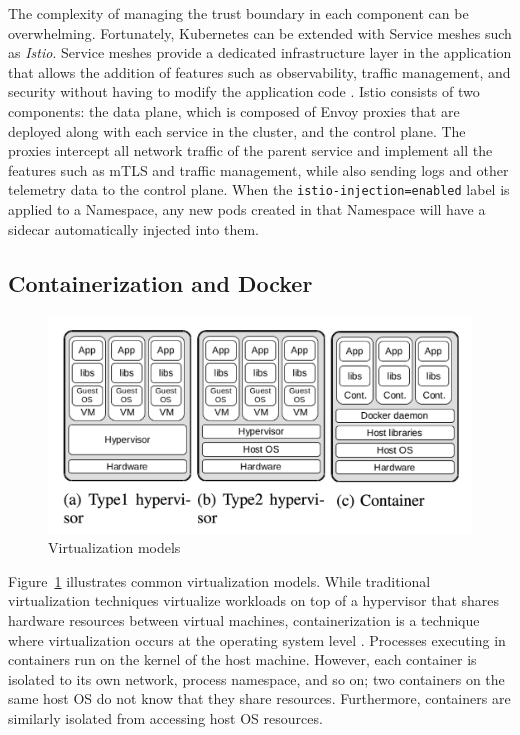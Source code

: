 \documentclass[english, 12pt, a4paper, sci, utf8, a-2b, online]{aaltothesis}
\begin{document}
The complexity of managing the trust boundary in each component can be overwhelming.
Fortunately, Kubernetes can be extended with Service meshes such as \emph{Istio}.
Service meshes provide a dedicated infrastructure layer in the application that allows the addition of features such as observability, traffic management, and security without having to modify the application code \cite{istio}.
Istio consists of two components: the data plane, which is composed of Envoy proxies that are deployed along with each service in the cluster, and the control plane.
The proxies intercept all network traffic of the parent service and implement all the features such as mTLS and traffic management, while also sending logs and other telemetry data to the control plane.
When the \texttt{istio-injection=enabled} label is applied to a Namespace, any new pods created in that Namespace will have a sidecar automatically injected into them.

\subsection{Containerization and Docker}

\begin{figure}[h!]
  \centering
  \includegraphics[width=\linewidth]{files/figure-1.png}
  \caption{Virtualization models \cite{combe2016docker}} %
  \label{figure-1}
\end{figure}

Figure~\ref{figure-1} illustrates common virtualization models.
While traditional virtualization techniques virtualize workloads on top of a hypervisor that shares hardware resources between virtual machines, containerization is a technique where virtualization occurs at the operating system level \cite{merkel2014docker}.
Processes executing in containers run on the kernel of the host machine.
However, each container is isolated to its own network, process namespace, and so on; two containers on the same host OS do not know that they share resources.
Furthermore, containers are similarly isolated from accessing host OS resources.
\end{document}
